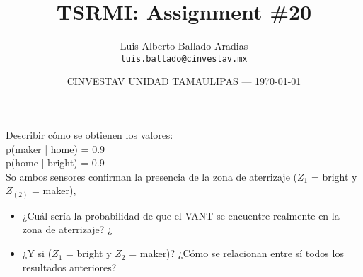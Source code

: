 \documentclass{article}
\title{TSRMI: Assignment \#20} %
\author{Luis Alberto Ballado Aradias\\ \texttt{luis.ballado@cinvestav.mx}} %
\date{CINVESTAV UNIDAD TAMAULIPAS --- \today} %
\begin{document}
\maketitle %


Describir c\'{o}mo se obtienen los valores:\\

p(maker | home) = 0.9\\
p(home | bright) = 0.9\\

So ambos sensores confirman la presencia de la zona de aterrizaje ($Z_{1}$ = bright y $Z_(2)$ = maker),
\begin{itemize}
  \item ¿Cu\'{a}l ser\'{i}a la probabilidad de que el VANT se encuentre realmente en la zona de aterrizaje? ¿
  \item ¿Y si ($Z_{1}$ = bright y $Z_{2}$ = maker)? ¿C\'{o}mo se relacionan entre s\'{i} todos los resultados anteriores?
\end{itemize}    
\end{document}
